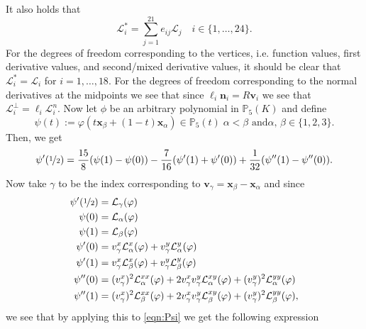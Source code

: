 It also holds that
\begin{equation}
  \mathcal{L}^*_i = \sum_{j=1}^{21} e_{ij} \mathcal{L}_j \quad i\in
  \{1,\dots,24\}.
  \label{eqn:FunctionalsE}
\end{equation}
For the degrees of freedom corresponding to the vertices, i.e. function values,
first derivative values, and second/mixed derivative values, it should be clear
that $\mathcal{L}^*_i = \mathcal{L}_i$ for $i=1,\dots,18$. For the degrees of
freedom corresponding to the normal derivatives at the midpoints we see that
since $\ell_i \mathbf{n}_i = R \mathbf{v}_i$ we see that $\mathcal{L}^{\perp}_i
= \ell_i \mathcal{L}^n_i$. Now let $\phi$ be an arbitrary polynomial in
$\mathbb{P}_5(K)$ and define
\begin{equation*}
  \psi(t) := \varphi(t\mathbf{x}_{\beta} + (1-t)\mathbf{x}_{\alpha}) \in
  \mathbb{P}_5(t) \; \alpha<\beta \text{ and} \alpha,\,\beta \in \{1,2,3\}.
\end{equation*}
Then, we get
\begin{equation}
  \psi'(\nicefrac{1}{2}) = \frac{15}{8} (\psi(1)-\psi(0)) -
  \frac{7}{16} (\psi'(1)+\psi'(0)) + \frac{1}{32} (\psi''(1)-\psi''(0)).
  \label{eqn:Psi}
\end{equation}
Now take $\gamma$ to be the index corresponding to $\mathbf{v}_{\gamma} =
\mathbf{x}_{\beta} - \mathbf{x}_{\alpha}$ and since
\begin{align*}
  \psi'(\nicefrac{1}{2}) &= \mathcal{L}_{\gamma}(\varphi) \\
  \psi(0) &= \mathcal{L}_{\alpha}(\varphi) \\
  \psi(1) &= \mathcal{L}_{\beta}(\varphi) \\
  \psi'(0) &= v^x_{\gamma}\mathcal{L}^x_{\alpha}(\varphi) +
    v^y_{\gamma}\mathcal{L}^y_{\alpha}(\varphi) \\
  \psi'(1) &= v^x_{\gamma}\mathcal{L}^x_{\beta}(\varphi) +
    v^y_{\gamma}\mathcal{L}^y_{\beta}(\varphi) \\
  \psi''(0) &= (v^x_{\gamma})^2\mathcal{L}^{xx}_{\alpha}(\varphi) +
    2 v^x_{\gamma}v^y_{\gamma}\mathcal{L}^{xy}_{\alpha}(\varphi) +
    (v^y_{\gamma})^2\mathcal{L}^{yy}_{\alpha}(\varphi) \\
  \psi''(1) &= (v^x_{\gamma})^2\mathcal{L}^{xx}_{\beta}(\varphi) +
    2 v^x_{\gamma}v^y_{\gamma}\mathcal{L}^{xy}_{\beta}(\varphi) +
    (v^y_{\gamma})^2\mathcal{L}^{yy}_{\beta}(\varphi),
\end{align*}
we see that by applying this to \eqref{eqn:Psi} we get the following expression
